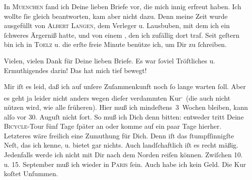 \pstart
           In \textsc{Muenchen} fand ich Deine lieben Briefe vor, die mich innig erfreut haben. Ich wollte{ }ſie
               gleich beantworten, kam aber nicht dazu. Denn meine Zeit wurde ausgefüllt von \textsc{Albert Langen}, dem Verleger u. Lausbuben, mit dem ich ein{ }ſchweres Ärgerniß hatte, und von einem \label{K_L02743-1v}\label{K_L02743-1}, den ich
               zufällig dort traf. Seit geſtern bin ich in \textsc{Toelz} u. die erſte freie Minute benütze ich, um Dir zu{ }ſchreiben.\pend
           
\pstart
           Vielen, vielen Dank für Deine lieben Briefe. Es war{ }ſoviel Tröſtliches u.
               Ermuthigendes darin! Das hat mich tief bewegt! {\dotsfive}\pend
           
\pstart
           Mir iſt es leid, daß ich auf unſere Zuſammenkunft noch{ }ſo lange warten {\pb}ſoll. Aber es geht ja leider nicht anders wegen
               dieſer verdammten Kur\substVorne{}\textsuperscript{,}\substDazwischen{} (\substHinten{}die auch nicht nützen wird, wie alle früheren). Hier muß ich
               mindeſtens 3 Wochen bleiben, kann alſo vor 30.{ }Auguſt nicht fort. So muß ich Dich denn bitten: entweder
               tritt Deine \textsc{Bicycle}-Tour fünf Tage{ }ſpäter an {\pb}oder komme auf ein paar Tage hierher. Letzteres wäre
               freilich eine  Zumuthung für Dich. Denn \label{K_L02743-2v}\label{K_L02743-2} iſt das{ }ſtumpfſinnigſte Neſt, das ich kenne, u.  bietet gar nichts. Auch landſchaftlich iſt es recht
               mäßig. Jedenfalls werde ich nicht mit Dir nach dem Norden reiſen können. Zwiſchen
                  10. u. 15. September{ }{\pb}muß ich wieder in \textsc{Paris}{ }ſein. Auch habe ich kein Geld. Die Kur koſtet Unſummen.\pend
           

